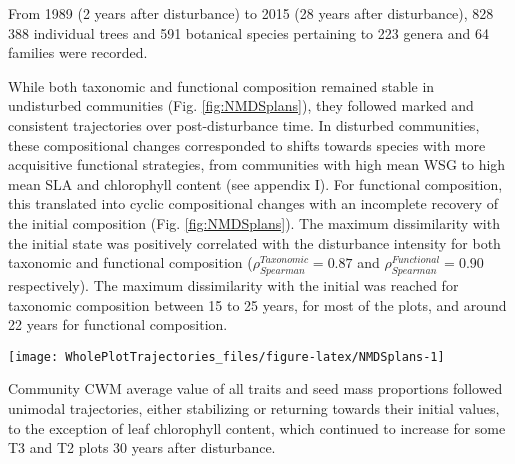 \documentclass[fleqn,10pt]{ArtEcoFoG} %
\begin{document}
From 1989 (2 years after disturbance) to 2015 (28 years after
disturbance), 828 388 individual trees and 591 botanical species
pertaining to 223 genera and 64 families were recorded.

While both taxonomic and functional composition remained stable in
undisturbed communities (Fig. \ref{fig:NMDSplans}), they followed marked
and consistent trajectories over post-\break disturbance time. In
disturbed communities, these compositional changes corresponded to
shifts towards species with more acquisitive functional strategies, from
communities with high mean WSG to high mean SLA and chlorophyll content
(see appendix I). For functional composition, this translated into
cyclic compositional changes with an incomplete recovery of the initial
composition (Fig. \ref{fig:NMDSplans}). The maximum dissimilarity with
the initial state was positively correlated with the disturbance
intensity for both taxonomic and functional composition
(\(\rho_{Spearman}^{Taxonomic}=0.87\) and
\(\rho_{Spearman}^{Functional}=0.90\) respectively). The maximum
dissimilarity with the initial was reached for taxonomic composition
between 15 to 25 years, for most of the plots, and around 22 years for
functional composition.

\begin{figure*}

{\centering \texttt{[image: WholePlotTrajectories\_files/figure-latex/NMDSplans-1]} 

}

\caption{Plot trajectories in terms of taxonomic composition (\textbf{(a)} and \textbf{(c)}) and functional composition (\textbf{(b)} and \textbf{(d)}) in a two-dimensional NMDS plan. Lower panels (\textbf{(c)} and \textbf{(d)}) represent the Euclidean distance to initial condition along the 30 sampled years. Shaded areas are the credibility intervals.}\label{fig:NMDSplans}
\end{figure*}

Community CWM average value of all traits and seed mass proportions
followed unimodal trajectories, either stabilizing or returning towards
their initial values, to the exception of leaf chlorophyll content,
which continued to increase for some T3 and T2 plots 30 years after
disturbance.
\end{document}
